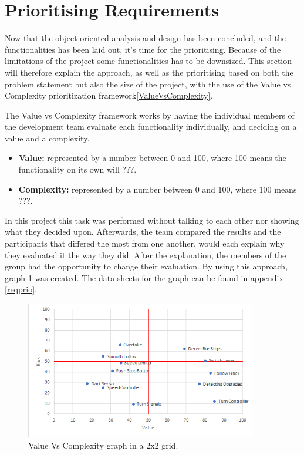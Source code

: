 \section{Prioritising Requirements}\label{section_riskVsValue}

Now that the object-oriented analysis and design has been concluded, and the functionalities has been laid out, it's time for the prioritising. Because of the limitations of the project some functionalities has to be downsized. This section will therefore explain the approach, as well as the prioritising based on both the problem statement but also the size of the project, with the use of the Value vs Complexity prioritization framework\ref{ValueVsComplexity}.

The Value vs Complexity framework works by having the individual members of the development team evaluate each functionality individually, and deciding on a value and a complexity.

\begin{itemize}
  \item \textbf{Value:} represented by a number between 0 and 100, where 100 means the functionality on its own will ???.
  
  \item \textbf{Complexity:} represented by a number between 0 and 100, where 100 means ???. 
\end{itemize}

In this project this task was performed without talking to each other nor showing what they decided upon. Afterwards, the team compared the results and the participants that differed the most from one another, would each explain why they evaluated it the way they did. After the explanation, the members of the group had the opportunity to change their evaluation. By using this approach, graph \ref{fig:ValueVsComplexity} was created. The data sheets for the graph can be found in appendix \ref{reqprio}.

\begin{figure}[H]
    \centering
	\includegraphics[width=0.9\textwidth]{Images/Graphs/RiskValue.png}
    \caption{Value Vs Complexity graph in a 2x2 grid.}
    \label{fig:ValueVsComplexity}
\end{figure}

